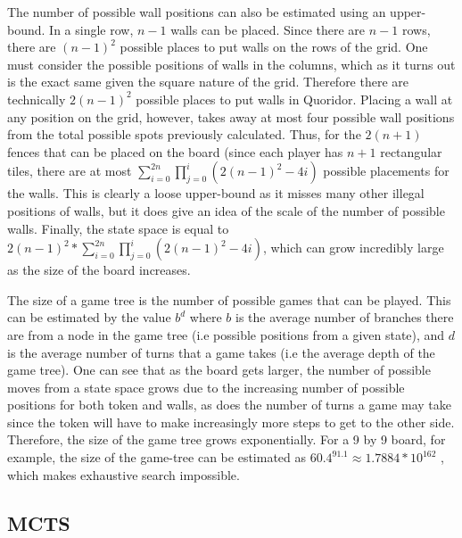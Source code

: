 \documentclass[journal, a4paper]{IEEEtran}
\begin{document}
The number of possible wall positions can also be estimated using an upper-bound. In a single row, $n-1$ walls can be placed. Since there are $n-1$ rows, there are $(n-1)^{2}$ possible places to put walls on the rows of the grid. One must consider the possible positions of walls in the columns, which as it turns out is the exact same given the square nature of the grid. Therefore there are technically $2(n-1)^{2}$ possible places to put walls in Quoridor. 
Placing a wall at any position on the grid, however, takes away at most four possible wall positions from the total possible spots previously calculated. Thus, for the $2(n+1)$ fences that can be placed on the board (since each player has $n+1$ rectangular tiles, there are at most $\sum_{i=0}^{2n} \prod_{j=0}^{i}(2(n-1)^2 - 4i)$ possible placements for the walls. This is clearly a loose upper-bound as it misses many other illegal positions of walls, but it does give an idea of the scale of the number of possible walls. Finally, the state space is equal to $2(n-1)^{2} * \sum_{i=0}^{2n} \prod_{j=0}^{i}(2(n-1)^2 - 4i)$, which can grow incredibly large as the size of the board increases.

The size of a game tree is the number of possible games that can be played. This can be estimated by the value $b^{d}$ where $b$ is the average number of branches there are from a node in the game tree (i.e possible positions from a given state), and $d$ is the average number of turns that a game takes (i.e the average depth of the game tree). One can see that as the board gets larger, the number of possible moves from a state space grows due to the increasing number of possible positions for both token and walls, as does the number of turns a game may take since the token will have to make increasingly more steps to get to the other side. 
Therefore, the size of the game tree grows exponentially. For a 9 by 9 board, for example, the size of the game-tree can be estimated as $60.4^{91.1} \approx 1.7884 * 10^{162}$ \cite{mastering-quoridor}, which makes exhaustive search impossible.


\subsection{MCTS}
\label{ssec:mcts}
\end{document}
